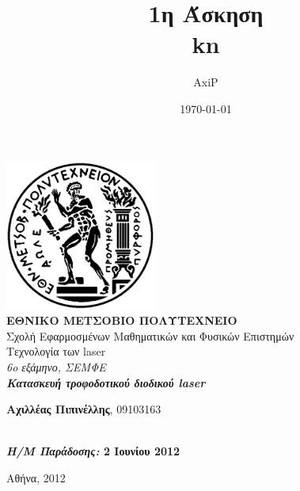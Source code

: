 \documentclass[a4paper,12pt,titlepage]{article}
\title{1η Άσκηση\\kn}
\author{AxiP}
\date{\today}
\begin{document}
\pagestyle{headings}    %

\begin{titlepage}
\begin{center}
\includegraphics[width=50mm]{pyrforos.pdf}\\[0.5cm]
\textbf{\LARGE ΕΘΝΙΚΟ ΜΕΤΣΟΒΙΟ ΠΟΛΥΤΕΧΝΕΙΟ}\\
\textrm{\Large Σχολή Εφαρμοσμένων Μαθηματικών και Φυσικών Επιστημών}\\[2.0cm]
\Huge{Τεχνολογία των laser\\}
\Large{\textit{6o εξάμηνο, ΣΕΜΦΕ}}\\[2.0cm]
\Large{\textit{\textbf{Κατασκευή τροφοδοτικού διοδικού laser}}}\\[5.0cm]
\normalsize

\begin{minipage}{0.49\textwidth}
\begin{flushleft}
\textbf{Αχιλλέας Πιπινέλλης}, 09103163
\end{flushleft}
\end{minipage}
\begin{minipage}{0.49\textwidth}
\begin{flushright}
\textbf{\\
\textit{Η/Μ Παράδοσης:} 2 Ιουνίου 2012}
\end{flushright}
\end{minipage}


\vfill
{Αθήνα, 2012}

\end{center}
\end{titlepage}
\end{document}
